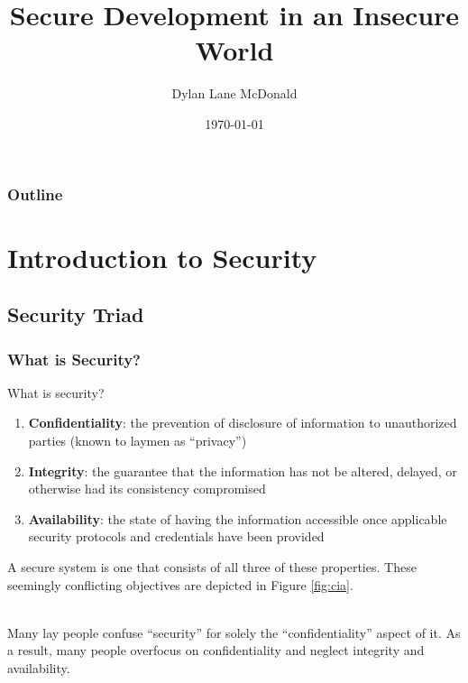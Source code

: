 \documentclass[aspectratio=169]{beamer}
\title{Secure Development in an Insecure World}
\author{Dylan Lane McDonald}
\institute{CNM STEMulus Center\\Web Development with PHP}
\date{\today}
\begin{document}
\lstset{language=Java}
\begin{frame}
\titlepage
\end{frame}

\begin{frame}
\frametitle{Outline}
\tableofcontents
\end{frame}

\section{Introduction to Security}
\subsection{Security Triad}
\begin{frame}
\frametitle{What is Security?}
What is security?
\pause
\begin{enumerate}
	\item \textbf{Confidentiality}: the prevention of disclosure of information to unauthorized parties (known to laymen as ``privacy'')
	\item \textbf{Integrity}: the guarantee that the information has not be altered, delayed, or otherwise had its consistency compromised
	\item \textbf{Availability}: the state of having the information accessible once applicable security protocols and credentials have been provided
\end{enumerate}
A secure system is one that consists of all three of these properties. These seemingly conflicting objectives are depicted in Figure \ref{fig:cia}.

\mbox{}\\
Many lay people confuse ``security'' for solely the ``confidentiality'' aspect of it. As a result, many people overfocus on confidentiality and neglect integrity and availability.
\end{frame}
\end{document}
